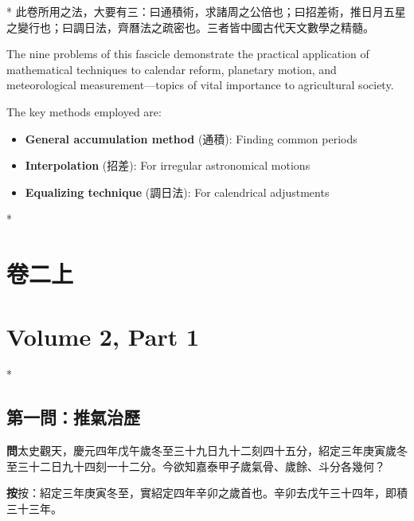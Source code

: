 \documentclass[11pt,a4paper]{article}
\newcommand{\WenCN}{\textbf{\color{headcolor}問}}
\newcommand{\AnCN}{\textbf{\color{headcolor}按}}
\begin{document}
\switchcolumn[0]*
此卷所用之法，大要有三：曰通積術，求諸周之公倍也；曰招差術，推日月五星之變行也；曰調日法，齊曆法之疏密也。三者皆中國古代天文數學之精髓。

\switchcolumn[1]
The nine problems of this fascicle demonstrate the practical application of mathematical techniques to calendar reform, planetary motion, and meteorological measurement---topics of vital importance to agricultural society.

The key methods employed are:
\begin{itemize}[noitemsep,topsep=0pt]
  \item \textbf{General accumulation method} (通積): Finding common periods
  \item \textbf{Interpolation} (招差): For irregular astronomical motions
  \item \textbf{Equalizing technique} (調日法): For calendrical adjustments
\end{itemize}

\newpage

\switchcolumn[0]*
\section*{卷二上}

\switchcolumn[1]
\section*{Volume 2, Part 1}

\vspace{1em}

\switchcolumn[0]*
\subsection*{第一問：推氣治歷}

\vspace{0.5em}
\WenCN{}\quad 太史觀天，慶元四年戊午歲冬至三十九日九十二刻四十五分，紹定三年庚寅歲冬至三十二日九十四刻一十二分。今欲知嘉泰甲子歲氣骨、歲餘、斗分各幾何？

\vspace{0.5em}
\AnCN{}\quad 按：紹定三年庚寅冬至，實紹定四年辛卯之歲首也。辛卯去戊午三十四年，即積三十三年。
\end{document}
